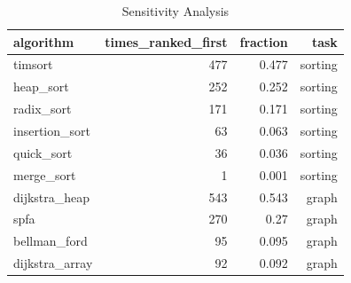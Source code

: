 \begin{table}[htbp]
\centering
\caption{Sensitivity Analysis}
\label{tab:sensitivity_analysis}
\begin{tabular}{lrrr}
\hline
algorithm & times_ranked_first & fraction & task \\
\hline
timsort & 477 & 0.477 & sorting \\
heap_sort & 252 & 0.252 & sorting \\
radix_sort & 171 & 0.171 & sorting \\
insertion_sort & 63 & 0.063 & sorting \\
quick_sort & 36 & 0.036 & sorting \\
merge_sort & 1 & 0.001 & sorting \\
dijkstra_heap & 543 & 0.543 & graph \\
spfa & 270 & 0.27 & graph \\
bellman_ford & 95 & 0.095 & graph \\
dijkstra_array & 92 & 0.092 & graph \\
\hline
\end{tabular}
\end{table}
